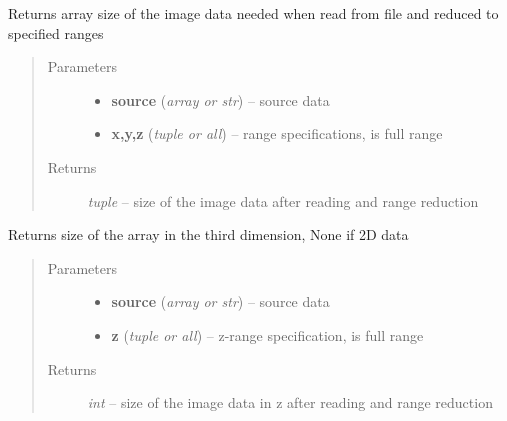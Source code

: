 \documentclass[letterpaper,10pt,english]{sphinxmanual}
\begin{document}

\begin{fulllineitems}
\label{api/ClearMap.IO:ClearMap.IO.IO.dataSize}
Returns array size of the image data needed when read from file and reduced to specified ranges
\begin{quote}\begin{description}
\item[{Parameters}] \leavevmode\begin{itemize}
\item {} 
\textbf{source} (\emph{array or str}) --
source data

\item {} 
\textbf{x,y,z} (\emph{tuple or all}) --
range specifications,  is full range

\end{itemize}

\item[{Returns}] \leavevmode
\emph{tuple} --
size of the image data after reading and range reduction

\end{description}\end{quote}

\end{fulllineitems}


\begin{fulllineitems}
\label{api/ClearMap.IO:ClearMap.IO.IO.dataZSize}
Returns size of the array in the third dimension, None if 2D data
\begin{quote}\begin{description}
\item[{Parameters}] \leavevmode\begin{itemize}
\item {} 
\textbf{source} (\emph{array or str}) --
source data

\item {} 
\textbf{z} (\emph{tuple or all}) --
z-range specification,  is full range

\end{itemize}

\item[{Returns}] \leavevmode
\emph{int} --
size of the image data in z after reading and range reduction

\end{description}\end{quote}

\end{fulllineitems}
\end{document}
